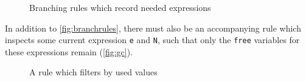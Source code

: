 \begin{figure}[ht]
  \begin{mdframed}[style=style1]
    \begin{subfigure}[b]{1\textwidth}
    \vspace*{0.19cm}
          \begin{prooftree}
          \end{prooftree}   
    \end{subfigure}
    \begin{subfigure}[b]{1\textwidth}
    \vspace*{0.49cm}
      \begin{prooftree}
      \end{prooftree}   
    \end{subfigure}
  \end{mdframed}
  \caption{Branching rules which record needed expressions}
  \label{fig:branchrules}
\end{figure}
In addition to \autoref{fig:branchrules}, there must also be an accompanying rule which inspects some current expression \texttt{e} and \texttt{N}, such that only the \texttt{free} variables for these expressions remain (\autoref{fig:gc}).
\begin{figure}[ht]
  \begin{mdframed}
    \begin{prooftree}
    \end{prooftree}   
  \end{mdframed}
  \caption{A rule which filters by used values}
  \label{fig:gc}
\end{figure}
